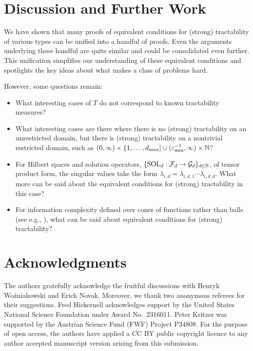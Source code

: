 \documentclass[sort&compress]{elsarticle}
\DeclareMathOperator{\SOL}{SOL}
\begin{document}
\section{Discussion and Further Work}

We have shown that many proofs of equivalent conditions for (strong) tractability of various types can be unified into a handful of proofs.  Even the arguments underlying these handful are quite similar and could be consolidated even further.  This unification simplifies our understanding of these equivalent conditions and spotlights the key ideas about what makes a class of problems hard.

However, some questions remain:
\begin{itemize}
    \item What interesting cases of $T$ do not correspond to known tractability measures? 
    \item What interesting cases are there where there is no (strong) tractability on an unrestricted domain, but there is (strong) tractability on a nontrivial restricted domain, such as $(0,\infty) \times \{1, \ldots, d_{\max}] \cup (\varepsilon_{\min}^{-1},\infty) \times \mathbb{N}$?
     \item For Hilbert spaces and solution operators, $\{\SOL_d : \cf_d \to \cg_d\}_{d \in \naturals}$, of tensor product form, the singular values take the form $\lambda_{i,d} = \lambda_{i,d,1} \cdots  \lambda_{i,d,d}$.  What more can be said about the  equivalent conditions  for (strong) tractability in this case?
    \item For information complexity defined over cones of functions rather than balls (see e.g., \cite{DinHic20a,DinEtal20a}), what can be said about equivalent conditions for (strong) tractability?
\end{itemize}


\section{Acknowledgments}
The authors gratefully acknowledge the fruitful discussions with Henryk Wo\'{z}niakowski and Erich Novak. Moreover, we thank two anonymous referees for their suggestions.  Fred Hickernell acknowledges support by the United States National Science Foundation under Award No.\ 2316011.
Peter Kritzer was supported by the Austrian Science Fund (FWF) Project P34808. For the purpose of open access, the authors have applied a CC BY public copyright licence to any author accepted manuscript version arising from this submission.
\end{document}
